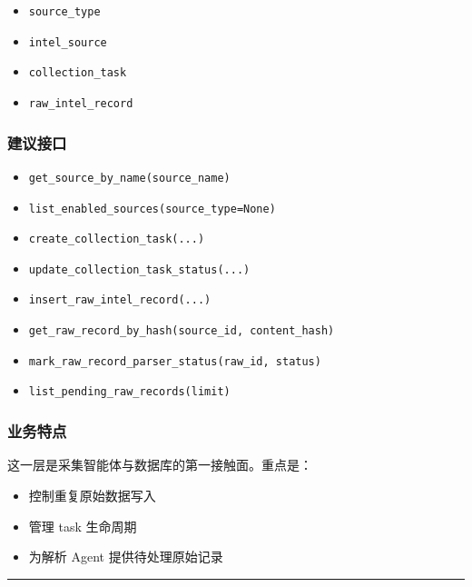 \documentclass[UTF8]{ctexart}
\providecommand{\tightlist}{%
  \setlength{\itemsep}{0pt}\setlength{\parskip}{0pt}}
\begin{document}
\begin{itemize}
\tightlist
\item
  \texttt{source\_type}
\item
  \texttt{intel\_source}
\item
  \texttt{collection\_task}
\item
  \texttt{raw\_intel\_record}
\end{itemize}

\hypertarget{ux5efaux8baeux63a5ux53e3}{%
\subsubsection{建议接口}\label{ux5efaux8baeux63a5ux53e3}}

\begin{itemize}
\tightlist
\item
  \texttt{get\_source\_by\_name(source\_name)}
\item
  \texttt{list\_enabled\_sources(source\_type=None)}
\item
  \texttt{create\_collection\_task(...)}
\item
  \texttt{update\_collection\_task\_status(...)}
\item
  \texttt{insert\_raw\_intel\_record(...)}
\item
  \texttt{get\_raw\_record\_by\_hash(source\_id,\ content\_hash)}
\item
  \texttt{mark\_raw\_record\_parser\_status(raw\_id,\ status)}
\item
  \texttt{list\_pending\_raw\_records(limit)}
\end{itemize}

\hypertarget{ux4e1aux52a1ux7279ux70b9}{%
\subsubsection{业务特点}\label{ux4e1aux52a1ux7279ux70b9}}

这一层是采集智能体与数据库的第一接触面。重点是：

\begin{itemize}
\tightlist
\item
  控制重复原始数据写入
\item
  管理 task 生命周期
\item
  为解析 Agent 提供待处理原始记录
\end{itemize}

\begin{center}\rule{0.5\linewidth}{0.5pt}\end{center}
\end{document}
